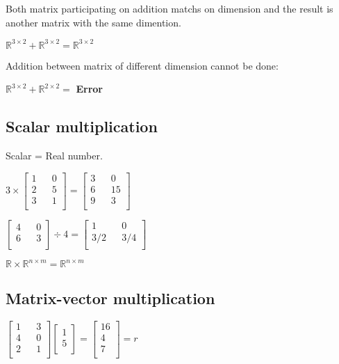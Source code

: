\documentclass[a4paper]{report}
\begin{document}
        Both matrix participating on addition matchs on dimension and the result is another matrix with the same dimention.

        $\mathbb{R}^{3\times2} + \mathbb{R}^{3\times2} = \mathbb{R}^{3\times2}$

        Addition between matrix of different dimension cannot be done:

        $\mathbb{R}^{3\times2} + \mathbb{R}^{2\times2} =$ \textbf{Error}

      \subsection{Scalar multiplication}

        Scalar = Real number.

        $3 \times \begin{bmatrix}
          1 && 0 \\
          2 && 5 \\
          3 && 1 \\
        \end{bmatrix}
        =
        \begin{bmatrix}
          3 && 0 \\
          6 && 15 \\
          9 && 3 \\
        \end{bmatrix}$
        
        $\begin{bmatrix}
          4 && 0 \\
          6 && 3 \\
        \end{bmatrix}
        \div 4
        =
        \begin{bmatrix}
          1 && 0 \\
          3/2 && 3/4 \\
        \end{bmatrix}$

        $\mathbb{R} \times \mathbb{R}^{n \times m} = \mathbb{R}^{n \times m}$

      \subsection{Matrix-vector multiplication}

        $\begin{bmatrix}
          1 && 3 \\
          4 && 0 \\
          2 && 1 \\
        \end{bmatrix}
        \begin{bmatrix}
          1 \\
          5 \\
        \end{bmatrix}
        =
        \begin{bmatrix}
          16 \\
          4 \\
          7 \\
        \end{bmatrix}
        = r$
\end{document}

